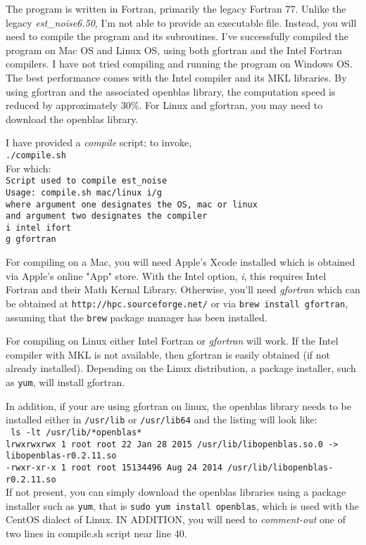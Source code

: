 \documentclass[12pt]{amsart}
\begin{document}
The program is written in Fortran, primarily the legacy Fortran 77. Unlike the legacy \textit{est\_noise6.50}, I'm not
able to provide an executable file. Instead, you will need to compile the program and its subroutines. I've successfully
compiled the program on Mac OS and Linux OS, using both gfortran and the Intel Fortran compilers. 
I have not tried compiling and running the program on Windows OS. The best performance
comes with the Intel compiler and its MKL libraries.  By using gfortran and the associated openblas library, the computation speed is reduced by approximately 30\%.  For Linux and gfortran, you may need to download the openblas library.


I have provided a \textit{compile} script; to invoke,
\\
\texttt{./compile.sh}
\\
For which:
\\
\texttt{Script used to compile est\_noise \\
Usage:  compile.sh mac/linux i/g  \\
  where argument one designates the OS, mac or linux  \\
    and argument two designates the compiler \\
    i   intel ifort  \\
    g   gfortran
}

For compiling on a Mac, you will need Apple's Xcode installed which is obtained via Apple's online "App" store.
With the Intel option, \textit{i},
this requires Intel Fortran and their Math Kernal Library.  Otherwise, you'll need \textit{gfortran} which can
be obtained at \texttt{http://hpc.sourceforge.net/} or via \texttt{brew install gfortran}, assuming that the \texttt{brew} package
manager has been installed.

For compiling on Linux either Intel Fortran or \textit{gfortran} will work.  If the Intel compiler with MKL
is not available, then gfortran is easily obtained (if not already installed).  Depending on the Linux
distribution, a package installer, such as \texttt{yum}, will install gfortran.

In addition, if your are using gfortran on linux, the openblas library needs to be installed either in  \texttt{/usr/lib} or \texttt{/usr/lib64} and the listing will look like:
\\
\tiny{
\texttt{
ls -lt /usr/lib/*openblas*
\\
lrwxrwxrwx 1 root root       22 Jan 28  2015 /usr/lib/libopenblas.so.0 -> libopenblas-r0.2.11.so
\\
-rwxr-xr-x 1 root root 15134496 Aug 24  2014 /usr/lib/libopenblas-r0.2.11.so
}
}
\normalsize{ }
\\
If not present, you can simply download the openblas libraries using a package installer such as \texttt{yum}, that
is \texttt{sudo yum install openblas}, which is used with the CentOS dialect of Linux. IN ADDITION, you will need to
\textit{comment-out} one of two lines in compile.sh script near line 40.
\end{document}
